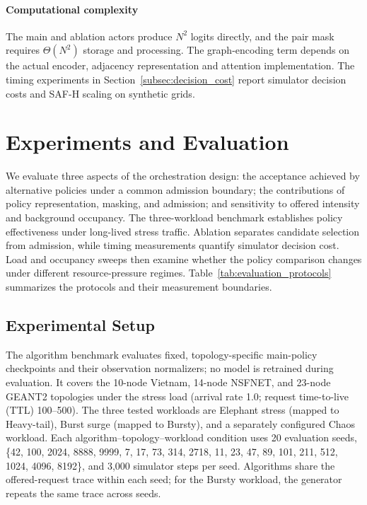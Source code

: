 \documentclass[final,5p]{elsarticle}
\newcommand{\rev}[1]{\textcolor{revisiongreen}{#1}}
\let\newrev\rev
\begin{document}
\paragraph{Computational complexity}\label{subsec:harp_complexity}
\newrev{The main and ablation actors produce \(N^2\) logits directly, and the pair mask requires \(\Theta(N^2)\) storage and processing. The graph-encoding term depends on the actual encoder, adjacency representation and attention implementation. The timing experiments in Section~\ref{subsec:decision_cost} report simulator decision costs and SAF-H scaling on synthetic grids.}

\section{Experiments and Evaluation}
\label{sec:evaluation}
\newrev{We evaluate three aspects of the orchestration design: the acceptance achieved by alternative policies under a common admission boundary; the contributions of policy representation, masking, and admission; and sensitivity to offered intensity and background occupancy. The three-workload benchmark establishes policy effectiveness under long-lived stress traffic. Ablation separates candidate selection from admission, while timing measurements quantify simulator decision cost. Load and occupancy sweeps then examine whether the policy comparison changes under different resource-pressure regimes. Table~\ref{tab:evaluation_protocols} summarizes the protocols and their measurement boundaries.}

\subsection{\newrev{Experimental Setup}}
\label{subsec:experimental_setup}
\newrev{The algorithm benchmark evaluates fixed, topology-specific main-policy checkpoints and their observation normalizers; no model is retrained during evaluation. It covers the 10-node Vietnam, 14-node NSFNET, and 23-node GEANT2 topologies under the stress load (arrival rate 1.0; request time-to-live (TTL) 100--500). The three tested workloads are Elephant stress (mapped to Heavy-tail), Burst surge (mapped to Bursty), and a separately configured Chaos workload. Each algorithm--topology--workload condition uses 20 evaluation seeds, \{42, 100, 2024, 8888, 9999, 7, 17, 73, 314, 2718, 11, 23, 47, 89, 101, 211, 512, 1024, 4096, 8192\}, and 3,000 simulator steps per seed. Algorithms share the offered-request trace within each seed; for the Bursty workload, the generator repeats the same trace across seeds.}
\end{document}
